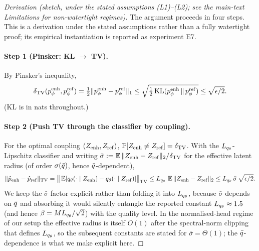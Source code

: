 \begin{proof}[Derivation (sketch, under the stated assumptions (L1)--(L2); see the main-text
Limitations for non-watertight regimes)]
The argument proceeds in four steps. This is a derivation under the stated assumptions rather
than a fully watertight proof; its empirical instantiation is reported as experiment E7.

\paragraph{Step 1 (Pinsker: KL $\to$ TV).}
By Pinsker's inequality,
\begin{equation}
\delta_{\mathrm{TV}}(p_\phi^{\mathrm{enh}},p_\phi^{\mathrm{ref}})
= \tfrac{1}{2}\|p_\phi^{\mathrm{enh}}-p_\phi^{\mathrm{ref}}\|_1
\leq \sqrt{\tfrac{1}{2}\operatorname{KL}(p_\phi^{\mathrm{enh}}\,\|\,p_\phi^{\mathrm{ref}})} \leq \sqrt{\epsilon/2}.
\label{eq:l3-1}
\end{equation}
(KL is in nats throughout.)

\paragraph{Step 2 (Push TV through the classifier by coupling).}
For the optimal coupling $(Z_{\mathrm{enh}},Z_{\mathrm{ref}})$, $\mathbb{P}[Z_{\mathrm{enh}}\neq Z_{\mathrm{ref}}]=\delta_{\mathrm{TV}}$. With the
$L_{q_\theta}$-Lipschitz classifier and writing $\bar{\sigma}:=\operatorname*{\mathbb{E}}\|Z_{\mathrm{enh}}-Z_{\mathrm{ref}}\|_2/\delta_{\mathrm{TV}}$ for the
effective latent radius (of order $\sigma(\bar{q})$, hence $\bar{q}$-dependent),
\begin{equation}
\|\hat{p}_{\mathrm{enh}}-\hat{p}_{\mathrm{ref}}\|_{\mathrm{TV}}
= \big\|\operatorname*{\mathbb{E}}[q_\theta(\cdot\mid Z_{\mathrm{enh}})-q_\theta(\cdot\mid Z_{\mathrm{ref}})]\big\|_{\mathrm{TV}}
\leq L_{q_\theta}\,\operatorname*{\mathbb{E}}\|Z_{\mathrm{enh}}-Z_{\mathrm{ref}}\|_2 \leq L_{q_\theta}\,\bar{\sigma}\,\sqrt{\epsilon/2}.
\label{eq:l3-2}
\end{equation}
We keep the $\bar{\sigma}$ factor explicit rather than folding it into $L_{q_\theta}$, because
$\bar{\sigma}$ depends on $\bar{q}$ and absorbing it would silently entangle the reported
constant $L_{q_\theta}\approx 1.5$ (and hence $\beta=ML_{q_\theta}/\sqrt{2}$) with the quality level.
In the normalised-head regime of our setup the effective radius is itself $O(1)$ after the
spectral-norm clipping that defines $L_{q_\theta}$, so the subsequent constants are stated for
$\bar{\sigma}=\Theta(1)$; the $\bar{q}$-dependence is what we make explicit here.


\end{proof}
